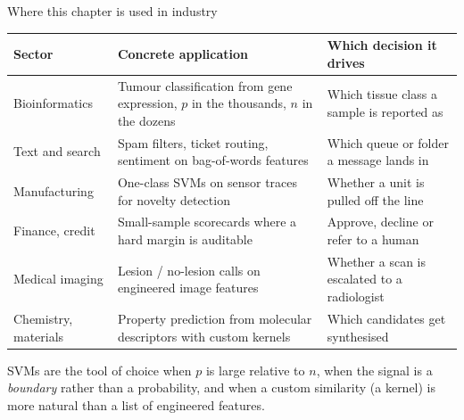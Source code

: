 \documentclass[aspectratio=169,11pt]{beamer}
\begin{document}
\begin{frame}{Where this chapter is used in industry}
  \scriptsize
  \begin{center}
  \begin{tabular}{@{}p{2.5cm}p{5.1cm}p{4.5cm}@{}}
    \toprule
    \textbf{Sector} & \textbf{Concrete application} & \textbf{Which decision it drives} \\
    \midrule
    Bioinformatics & Tumour classification from gene expression, $p$ in the
      thousands, $n$ in the dozens & Which tissue class a sample is reported as \\
    Text and search & Spam filters, ticket routing, sentiment on
      bag-of-words features & Which queue or folder a message lands in \\
    Manufacturing & One-class SVMs on sensor traces for novelty detection &
      Whether a unit is pulled off the line \\
    Finance, credit & Small-sample scorecards where a hard margin is
      auditable & Approve, decline or refer to a human \\
    Medical imaging & Lesion / no-lesion calls on engineered image
      features & Whether a scan is escalated to a radiologist \\
    Chemistry, materials & Property prediction from molecular descriptors with
      custom kernels & Which candidates get synthesised \\
    \bottomrule
  \end{tabular}
  \end{center}
  \begin{industry}
    SVMs are the tool of choice when $p$ is large relative to $n$, when the
    signal is a \emph{boundary} rather than a probability, and when a custom
    similarity (a kernel) is more natural than a list of engineered features.
  \end{industry}
\end{frame}
\end{document}
